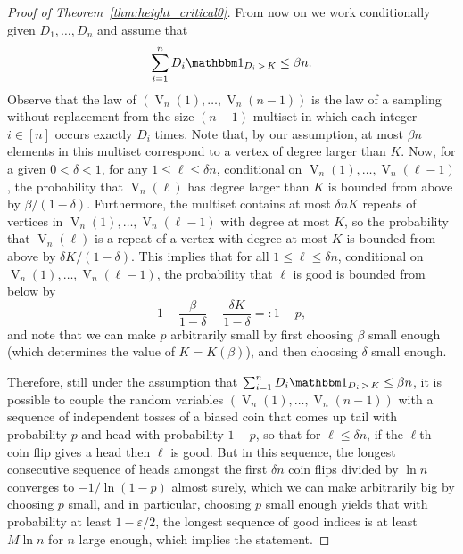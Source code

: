 \documentclass[10pt]{amsart}
\theoremstyle{definition}
\numberwithin{figure}{section}
\DeclareMathOperator{\rseq}{V}
\newcommand{\I}[1]{{\mathbbm 1}_{#1}}
\begin{document}
\begin{proof}[Proof of Theorem~\ref{thm:height_critical0}]
From now on we work conditionally given $D_1,\dots, D_n$ and assume that
\[
\sum_{i=1}^n D_i\I{D_i\,>\,K}\leq \beta n.
\]
Observe that {the law of} $(\rseq_n(1),\dots, \rseq_n(n-1))$ is {the law of a} sampling without replacement from the size-$(n-1)$ multiset in which each integer $i\in [n]$ occurs exactly $D_i$ times. Note that, by our assumption, at most $\beta n$ elements in this multiset correspond to a vertex of degree larger than $K$. Now, for a given $0<\delta<1$, for any $1\leq \ell \leq \delta n$, conditional on $\rseq_n(1),\dots, \rseq_n(\ell-1)$, the probability that $\rseq_n(\ell)$ has degree larger than $K$ is bounded from above by $\beta/(1-\delta)$. Furthermore, the multiset contains at most $\delta n K$ repeats of vertices in $\rseq_n(1),\dots, \rseq_n(\ell-1)$ with degree at most $K$, so the probability that $\rseq_n(\ell)$ is a repeat of a vertex with degree at most $K$ is bounded from above by $\delta K/(1-\delta)$. This implies that for all $1 \le \ell \le \delta n$, conditional on $\rseq_n(1),\dots, \rseq_n(\ell-1)$, the probability that $\ell$ is good is bounded from below by
\[
1-\frac{\beta}{1-\delta} -\frac{\delta K}{1-\delta} =:1-p,
\]
and note that we can make $p$ arbitrarily small by first choosing $\beta$ small enough (which determines the value of $K=K(\beta)$), and then choosing $\delta$ small enough.

Therefore, still under the assumption that $\sum_{i=1}^n D_i\I{D_i\,>\,K}\leq \beta n$, it is possible to couple the random variables ${(\rseq_n(1),\dots, \rseq_n(n-1))}$ with a sequence of independent tosses of a biased coin that comes up tail with probability $p$ and head with probability $1-p$, so that for $\ell\leq \delta n$, {if the $\ell$th coin flip gives a head then $\ell$ is good.} But in this sequence, the longest consecutive sequence of heads amongst the first $\delta n$ coin flips divided by $\ln n$ converges to $-1/\ln(1-p)$ almost surely, which we can make arbitrarily big by choosing $p$ small, and in particular, choosing $p$ small enough yields that with probability at least $1-\varepsilon/2$, the longest sequence of good indices is at least $M\ln n$ for $n$ large enough, which implies the statement.
\end{proof}
\end{document}
